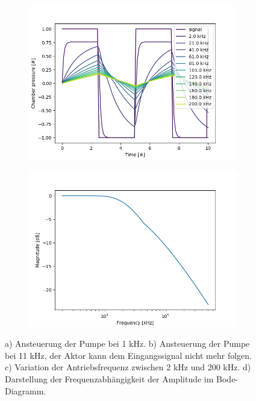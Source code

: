 \documentclass[fontsize=12pt, a4paper]{scrartcl}
\begin{document}
\begin{figure}[H]
\begin{subfigure}[H]{0.48\textwidth}
        \includegraphics[width=\textwidth, valign=t]{bilder/frequency/frequency_sweep.png}
        \label{fig:frequency_sweep}
    \end{subfigure}
    \begin{subfigure}[H]{0.48\textwidth}
        \includegraphics[width=\textwidth, valign=t]{bilder/frequency/bode_diagram.png}
        \label{fig:frequency_bode}
    \end{subfigure}
    \caption{a) Ansteuerung der Pumpe bei 1 kHz. b) Ansteuerung der Pumpe bei 11 kHz, der Aktor kann dem Eingangssignal nicht mehr folgen. c) Variation der Antriebsfrequenz zwischen 2 kHz und 200 kHz. d) Darstellung der Frequenzabhängigkeit der Amplitude im Bode-Diagramm.}
\end{figure}
\end{document}
